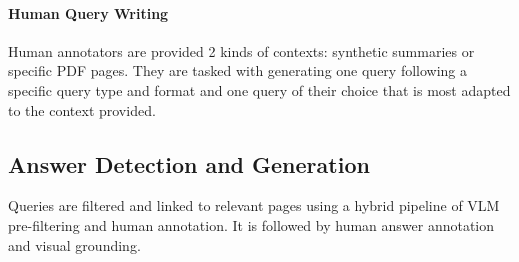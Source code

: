 \paragraph{Human Query Writing} Human annotators are provided 2 kinds of contexts: synthetic summaries or specific PDF pages. They are tasked with generating one query following a specific query type and format and one query of their choice that is most adapted to the context provided.




\subsection{Answer Detection and Generation} \label{vidorev3:sec: grounded qa}

Queries are filtered and linked to relevant pages using a hybrid pipeline of VLM pre-filtering and human annotation. It is followed by human answer annotation and visual grounding.


